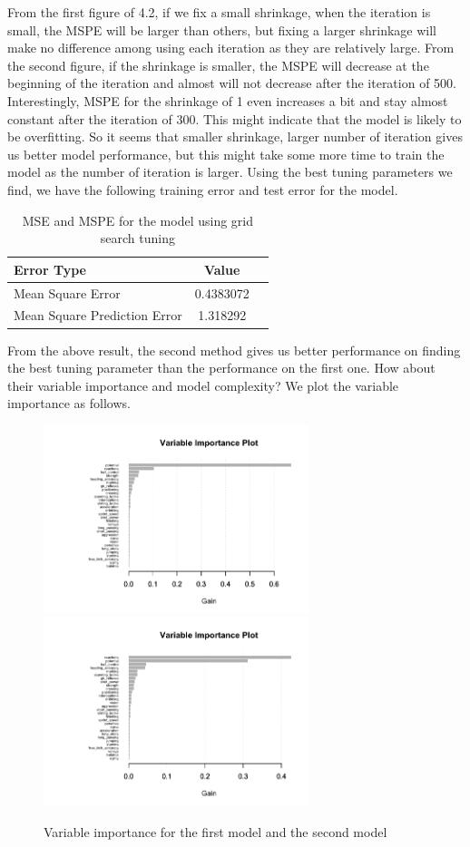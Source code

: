 \documentclass[11pt]{article}
\begin{document}
\noindent From the first figure of 4.2, if we fix a small shrinkage, when the iteration is small, the MSPE will  be larger than others, but fixing a larger shrinkage will make no difference among using each iteration as they are relatively large. From the second figure, if the shrinkage is smaller, the MSPE will decrease at the beginning of the iteration and almost will not decrease after the iteration of 500. Interestingly, MSPE for the shrinkage of 1 even increases a bit and stay almost constant after the iteration of 300. This might indicate that the model is likely to be overfitting. So it seems that smaller shrinkage, larger number of iteration gives us better model performance, but this might take some more time to train the model as the number of iteration is larger. Using the best tuning parameters we find, we have the following training error and test error for the model.\\
\begin{table}[h]
    \label{default_model}
    \centering
    \begin{tabular}{l c c}
        \hline
        \textbf{Error Type} & \textbf{Value} \\ \hline
        Mean Square Error & 0.4383072 \\
        Mean Square Prediction Error & 1.318292 \\
        \hline
    \end{tabular}
    \caption{MSE and MSPE for the model using grid search tuning}
\end{table}

\noindent From the above result, the second method gives us better performance on finding the best tuning parameter than the performance on the first one. How about their variable importance and model complexity? We plot the variable importance as follows.\\
\begin{figure}[h]
\centering
\includegraphics[height=5.5cm]{varImpXgb}\quad
\includegraphics[height=5.5cm]{varImpXgb2}\caption{Variable importance for the first model and the second model}
\end{figure}
\end{document}
